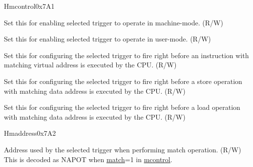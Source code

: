 \begin{register}{H}{mcontrol}{0x7A1}
\begin{regdesc}
\begin{reglist}
\label{fielddesc:MCONTROLM}\item [m] Set this for enabling selected trigger to operate in machine-mode. (R/W)
\label{fielddesc:MCONTROLU}\item [u] Set this for enabling selected trigger to operate in user-mode. (R/W)
\label{fielddesc:MCONTROLEXECUTE}\item [execute] Set this for configuring the selected trigger to fire right before an instruction with matching virtual address is executed by the CPU. (R/W)
\label{fielddesc:MCONTROLSTORE}\item [store] Set this for configuring the selected trigger to fire right before a store operation with matching data address is executed by the CPU. (R/W)
\label{fielddesc:MCONTROLLOAD}\item [load] Set this for configuring the selected trigger to fire right before a load operation with matching data address is executed by the CPU. (R/W)
\end{reglist}\end{regdesc}
\end{register}

\begin{register}{H}{maddress}{0x7A2}\label{regdesc:MADDRESS}
%
\regnewline%
\begin{regdesc}\begin{reglist}
\label{fielddesc:MADDRESS}\item [maddress] Address used by the selected trigger when performing match operation. (R/W) \newline This is decoded as NAPOT when \hyperref[fielddesc:MCONTROLMATCH]{match}=1 in \hyperref[regdesc:MCONTROL]{mcontrol}.
\end{reglist}\end{regdesc}
\end{register}

